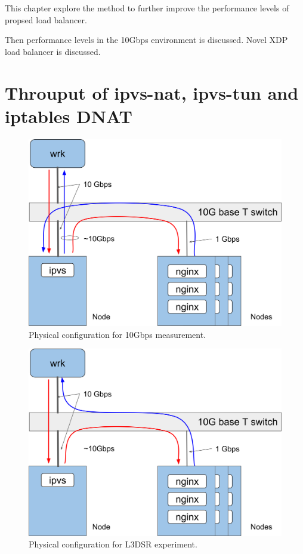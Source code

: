 This chapter explore the method to further improve the performance levels of propsed load balancer.

Then performance levels in the 10Gbps environment is discussed.
Novel XDP load balancer is discussed.

\section{Throuput of ipvs-nat, ipvs-tun and iptables DNAT}

\begin{figure}[h]
  \centering
  \includegraphics[width=0.8\columnwidth]{Figs/bench_10g}
  \caption{Physical configuration for 10Gbps measurement.}
  \label{fig:bench_10g}
\end{figure}

\begin{figure}[h]
  \centering
  \includegraphics[width=0.8\columnwidth]{Figs/bench_10g_l3dsr}
  \caption{Physical configuration for L3DSR experiment.}
  \label{fig:bench_10g_l3dsr}
\end{figure}


